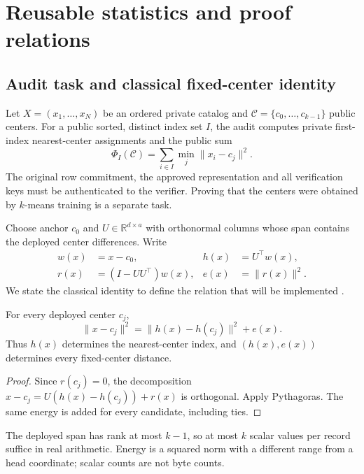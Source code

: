 \section{Reusable statistics and proof relations}\label{sec:design}
\subsection{Audit task and classical fixed-center identity}\label{sec:background}
Let $X=(x_1,\ldots,x_N)$ be an ordered private catalog and $\mathcal C=\{c_0,\ldots,c_{k-1}\}$ public centers. For a public sorted, distinct index set $I$, the audit computes private first-index nearest-center assignments and the public sum
\begin{equation}
\Phi_I(\mathcal C)=\sum_{i\in I}\min_j\|x_i-c_j\|^2.
\end{equation}
The original row commitment, the approved representation and all verification keys must be authenticated to the verifier. Proving that the centers were obtained by $k$-means training is a separate task.

Choose anchor $c_0$ and $U\in\mathbb R^{d\times a}$ with orthonormal columns whose span contains the deployed center differences. Write
\begin{align}
w(x)&=x-c_0,& h(x)&=U^\top w(x),\nonumber\\
r(x)&=(I-UU^\top)w(x),& e(x)&=\|r(x)\|^2.
\end{align}
We state the classical identity to define the relation that will be implemented \cite{feldman2013tiny,feldman2020tiny,cohen2015dimensionality}.
\begin{proposition}\label{prop:head-energy}
For every deployed center $c_j$,
\begin{equation}\label{eq:head-energy}
\|x-c_j\|^2=\|h(x)-h(c_j)\|^2+e(x).
\end{equation}
Thus $h(x)$ determines the nearest-center index, and $(h(x),e(x))$ determines every fixed-center distance.
\end{proposition}
\begin{proof}
Since $r(c_j)=0$, the decomposition $x-c_j=U(h(x)-h(c_j))+r(x)$ is orthogonal. Apply Pythagoras. The same energy is added for every candidate, including ties.
\end{proof}
The deployed span has rank at most $k-1$, so at most $k$ scalar values per record suffice in real arithmetic. Energy is a squared norm with a different range from a head coordinate; scalar counts are not byte counts.


